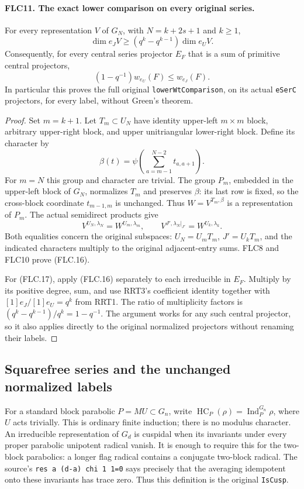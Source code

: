 \documentclass[11pt,a4paper]{article}
\numberwithin{equation}{section}
\theoremstyle{remark}\newtheorem{remark}[theorem]{Remark}
\begin{document}
\paragraph{FLC11. The exact lower comparison on every original series.}
\label{claim:FLC11}
For every representation $V$ of $G_N$, with $N=k+2s+1$ and
$k\ge1$,
\[
 \dim e_JV\ge(q^k-q^{k-1})\dim e_UV.
 \tag{FLC.16}
\]
Consequently, for every central series projector $E_F$ that
is a sum of primitive central projectors,
\[
           (1-q^{-1})w_{e_U}(F)\le w_{e_J}(F).
 \tag{FLC.17}
\]
In particular this proves the full original
\texttt{lower\allowbreak Wt\allowbreak Comparison}, on its actual \texttt{e\allowbreak Ser\allowbreak C}
projectors, for every label, without Green's theorem.
\begin{proof}
Set $m=k+1$.  Let $T_m\subset U_N$ have identity upper-left
$m\times m$ block, arbitrary upper-right block, and upper
unitriangular lower-right block.  Define its character by
\[
 \beta(t)=\psi\left(\sum_{a=m-1}^{N-2}t_{a,a+1}\right).
\]
For $m=N$ this group and character are trivial.
The group $P_m$, embedded in the upper-left block of $G_N$,
normalizes $T_m$ and preserves $\beta$: its last row is fixed,
so the cross-block coordinate $t_{m-1,m}$ is unchanged.
Thus $W=V^{T_m,\beta}$ is a representation of $P_m$.
The actual semidirect products give
\[
 V^{U_N,\lambda_N}=W^{U_m,\lambda_m},\qquad
 V^{J',\lambda_N|_{J'}}=W^{U_k,\lambda_k}.
\]
Both equalities concern the original subspaces: $U_N=U_mT_m$,
$J'=U_kT_m$, and the indicated characters multiply to the
original adjacent-entry sums.  FLC8 and FLC10 prove (FLC.16).

For (FLC.17), apply (FLC.16) separately to each irreducible
in $E_F$.  Multiply by its positive degree, sum, and use RRT3's
coefficient identity together with
$[1]e_J/[1]e_U=q^k$ from RRT1.  The ratio of multiplicity
factors is $(q^k-q^{k-1})/q^k=1-q^{-1}$.
The argument works for any such central projector, so it
also applies directly to the original normalized projectors
without renaming their labels.
\end{proof}

\subsection{Squarefree series and the unchanged normalized labels}

For a standard block parabolic $P=MU\subset G_n$, write
$\operatorname{HC}_P(\rho)=\operatorname{Ind}_P^{G_n}\rho$,
where $U$ acts trivially.  This is ordinary finite induction;
there is no modulus character.  An irreducible representation
of $G_d$ is cuspidal when its invariants under every proper
parabolic unipotent radical vanish.  It is enough to require
this for the two-block parabolics: a longer flag radical
contains a conjugate two-block radical.  The source's
\texttt{res a (d-a) chi 1 1=0} says precisely that the
averaging idempotent onto these invariants has trace zero.
Thus this definition is the original \texttt{Is\allowbreak Cusp}.
\end{document}
